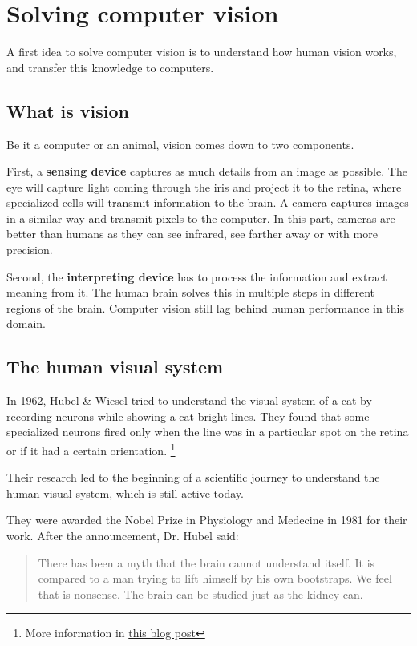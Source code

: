 \documentclass{article}
\begin{document}
\section{Solving computer vision} \label{solving}
A first idea to solve computer vision is to understand how human vision works, and transfer this knowledge to computers.

\subsection{What is vision}
Be it a computer or an animal, vision comes down to two components.

First, a \textbf{sensing device} captures as much details from an image as possible. The eye will capture light coming through the iris and project it to the retina, where specialized cells will transmit information to the brain. A camera captures images in a similar way and transmit pixels to the computer. In this part, cameras are better than humans as they can see infrared, see farther away or with more precision.

Second, the \textbf{interpreting device} has to process the information and extract meaning from it. The human brain solves this in multiple steps in different regions of the brain. Computer vision still lag behind human performance in this domain.

\subsection{The human visual system}

In 1962, Hubel \& Wiesel \cite{hubel} tried to understand the visual system of a cat by recording neurons while showing a cat bright lines. They found that some specialized neurons fired only when the line was in a particular spot on the retina or if it had a certain orientation.
\footnote{More information in \href{http://knowingneurons.com/2014/10/29/hubel-and-wiesel-the-neural-basis-of-visual-perception/}{this blog post}}

Their research led to the beginning of a scientific journey to understand the human visual system, which is still active today.

They were awarded the Nobel Prize in Physiology and Medecine in 1981 for their work. After the announcement, Dr. Hubel said:
\begin{quote}
There has been a myth that the brain cannot understand itself.  It is compared to a man trying to lift himself by his own bootstraps.  We feel that is nonsense.  The brain can be studied just as the kidney can.
\end{quote}
\end{document}
